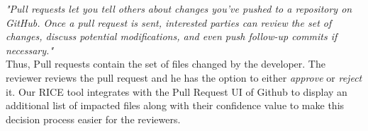 \textit{"Pull requests let you tell others about changes you've pushed to a repository on GitHub. Once a pull request is sent, interested parties can review the set of changes, discuss potential modifications, and even push follow-up commits if necessary."} ~\cite{GitHub} \\

Thus, Pull requests contain the set of files changed by the developer. The reviewer reviews the pull request and he has the option to either \textit{approve} or \textit{reject} it. Our RICE tool integrates with the Pull Request UI of Github to display an additional list of impacted files along with their confidence value to make this decision process easier for the reviewers.   




